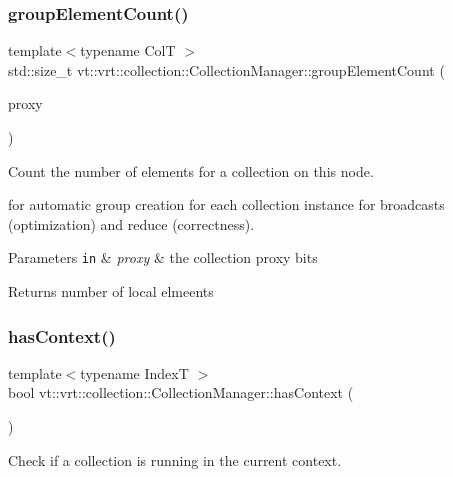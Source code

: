 \subsubsection{\texorpdfstring{group\+Element\+Count()}{groupElementCount()}}
{\footnotesize\ttfamily template$<$typename ColT $>$ \\
std\+::size\+\_\+t vt\+::vrt\+::collection\+::\+Collection\+Manager\+::group\+Element\+Count (\begin{DoxyParamCaption}\item[{\hyperlink{namespacevt_a1b417dd5d684f045bb58a0ede70045ac}{Virtual\+Proxy\+Type} const \&}]{proxy }\end{DoxyParamCaption})}



Count the number of elements for a collection on this node. 

for automatic group creation for each collection instance for broadcasts (optimization) and reduce (correctness).


\begin{DoxyParams}[1]{Parameters}
\mbox{\tt in}  & {\em proxy} & the collection proxy bits\\
\hline
\end{DoxyParams}
\begin{DoxyReturn}{Returns}
number of local elmeents 
\end{DoxyReturn}
\mbox{\label{structvt_1_1vrt_1_1collection_1_1_collection_manager_ad94808d98e429e50376a9d1b35de57ee}} 
\subsubsection{\texorpdfstring{has\+Context()}{hasContext()}}
{\footnotesize\ttfamily template$<$typename IndexT $>$ \\
bool vt\+::vrt\+::collection\+::\+Collection\+Manager\+::has\+Context (\begin{DoxyParamCaption}{ }\end{DoxyParamCaption})\hspace{0.3cm}{\ttfamily [static]}}



Check if a collection is running in the current context. 

